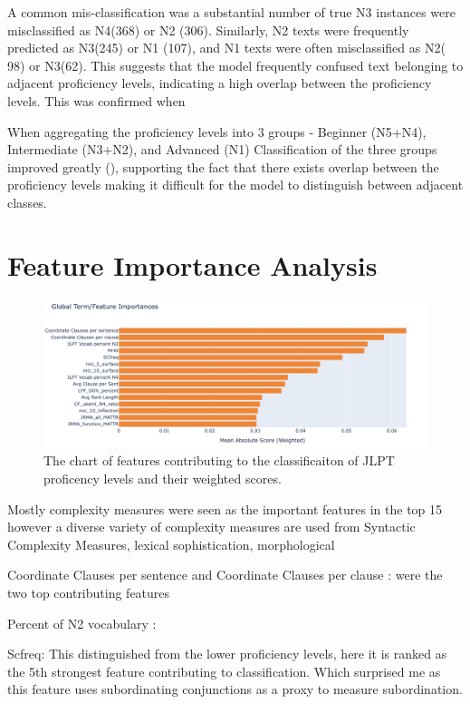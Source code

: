 A common mis-classification was a substantial number of true N3 instances were misclassified as N4(368) or N2 (306).
Similarly, N2 texts were frequently predicted as N3(245) or N1 (107), and N1 texts were often misclassified as N2(
98) or N3(62). This suggests that the model frequently confused text belonging to adjacent proficiency levels,
indicating a high overlap between the proficiency levels. This was confirmed when

When aggregating the proficiency levels into 3 groups - Beginner (N5+N4), Intermediate (N3+N2), and Advanced (N1)
Classification of the three groups improved greatly (), supporting the fact that there exists overlap between the
proficiency levels making it difficult for the model to distinguish between adjacent classes.

\section{Feature Importance Analysis}
\begin{figure}[h!]
    \centering
    \includegraphics[scale=.4]{img/feature_importance}
    \caption[Feature Importance Chart]{The chart of features contributing to the classificaiton of JLPT proficency levels and their weighted
    scores.}
    \label{fig:featureimportance}
\end{figure}

Mostly complexity measures were seen as the important features in the top 15 however a diverse variety of complexity
measures are used from Syntactic Complexity Measures, lexical sophistication, morphological

Coordinate Clauses per sentence and Coordinate Clauses per clause : were the two top contributing features

Percent of N2 vocabulary :

Scfreq: This distinguished from the lower proficiency levels, here it is ranked as the 5th strongest feature
contributing to classification. Which surprised me as this feature uses subordinating conjunctions as a proxy to
measure subordination.

